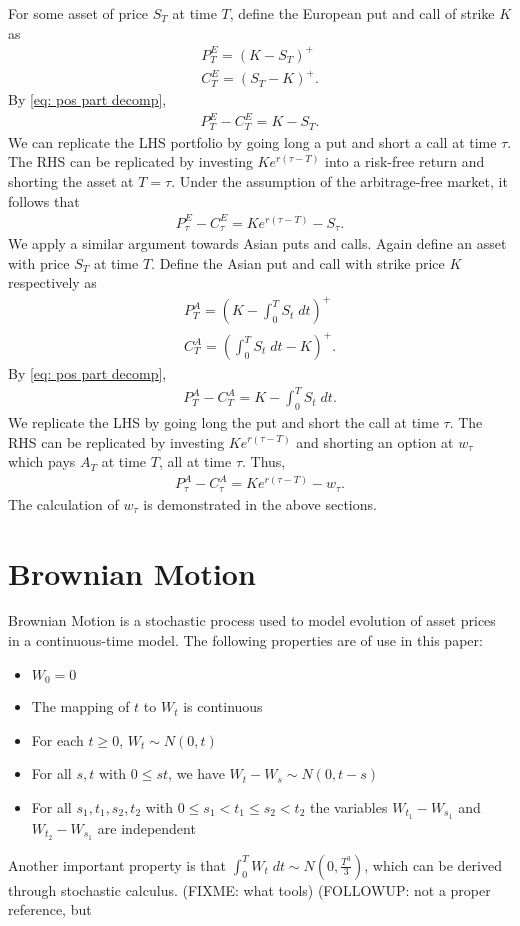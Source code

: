\documentclass[reqno]{amsart}
\begin{document}
For some asset of price $S_T$ at time $T$, define the European put and call of strike $K$ as 
\begin{align} 
     P^E_T = (K - S_T)^+ \\
     C^E_T = (S_T - K)^+.
\end{align}
By \eqref{eq: pos part decomp}, 
\begin{align} \label{Put-Call Parity European}
     P^E_T - C^E_T = K - S_T.
\end{align}
We can replicate the LHS portfolio by going long a put and short a call at time $\tau$. 
The RHS can be replicated by investing $Ke^{r(\tau - T)}$ into a risk-free return and shorting the asset at $T = \tau$.
Under the assumption of the arbitrage-free market, it follows that
\begin{align} 
     P^E_\tau - C^E_\tau = Ke^{r(\tau - T)} - S_\tau.
\end{align}
We apply a similar argument towards Asian puts and calls.
Again define an asset with price $S_T$ at time $T$.
Define the Asian put and call with strike price $K$ respectively as
\begin{align} 
     P^A_T = (K - \int_0^T S_t \;dt)^+ \\
     C^A_T = (\int_0^T S_t \;dt - K)^+.
\end{align}
By \eqref{eq: pos part decomp}, 
\begin{align} 
     P^A_T - C^A_T = K - \int_0^T S_t \;dt.
\end{align}
We replicate the LHS by going long the put and short the call at time $\tau$.
The RHS can be replicated by investing $Ke^{r(\tau - T)}$ and shorting an option at $w_\tau$ which pays $A_T$ at time $T$, all at time $\tau$.
Thus, 
\begin{align} \label{Put-Call Parity Asian}
     P^A_\tau - C^A_\tau = Ke^{r(\tau - T)} - w_\tau.
\end{align}
The calculation of $w_\tau$ is demonstrated in the above sections.

\section{Brownian Motion}\label{BM Appendix}
Brownian Motion is a stochastic process used to model evolution of asset prices in a continuous-time model.
The following properties are of use in this paper:
\begin{itemize}
     \item $W_0=0$
     \item The mapping of $t$ to $W_t$ is continuous
     \item For each $t \geq 0$, $W_t \sim N(0, t)$
     \item For all $s,t$ with $0 \leq s t$, we have $W_t-W_s \sim N(0, t-s)$
     \item For all $s_1, t_1, s_2, t_2$ with $0 \leq s_1 < t_1 \leq s_2 < t_2$ the variables $W_{t_1}-W_{s_1}$ and $W_{t_2}-W_{s_1}$ are independent
\end{itemize}
Another important property is that $\int^T_0 W_t \;dt \sim N(0, \frac{T^3}{3})$, which can be derived through stochastic calculus.
(FIXME: what tools) (FOLLOWUP: not a proper reference, but 
\end{document}
